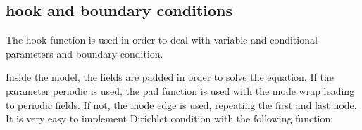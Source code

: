 \documentclass[letterpaper,10pt,english]{sphinxmanual}
\begin{document}
\begin{sphinxVerbatim}[commandchars=\\\{\}]
   
          
           
          
       

 
  

\end{sphinxVerbatim}

\noindent{}


\subsection{hook and boundary conditions}
\label{\detokenize{overview:hook-and-boundary-conditions}}
The hook function is used in order to deal with variable and conditional parameters and boundary condition.

Inside the model, the fields are padded in order to solve the equation. If the parameter \sphinxquotedblleft{}periodic\sphinxquotedblright{} is used, the pad function is used with the mode \sphinxquotedblleft{}wrap\sphinxquotedblright{} leading to periodic fields. If not, the mode \sphinxquotedblleft{}edge\sphinxquotedblright{} is used, repeating the first and last node. It is very easy to implement Dirichlet condition with the following function:
\end{document}
